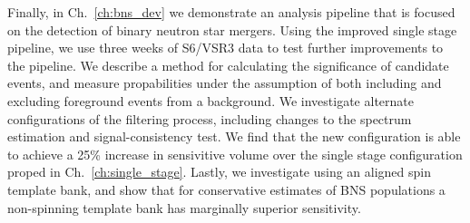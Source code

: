 Finally, in Ch.~\ref{ch:bns_dev} we demonstrate an analysis pipeline
that is focused on the detection of binary neutron star mergers. Using the 
improved single stage pipeline, we use three weeks of S6/VSR3 data to test 
further improvements to the pipeline. We describe a method for calculating
the significance of candidate events, and measure propabilities under the
assumption of both including and excluding foreground events from a background.
We investigate alternate configurations of the filtering process, including changes
to the spectrum estimation and signal-consistency test. We find that
the new configuration is able to achieve a 25\% increase in sensivitive volume over the
single stage configuration proped in Ch.~\ref{ch:single_stage}. Lastly,
we investigate using an aligned spin template bank, and show that for conservative 
estimates of BNS populations a non-spinning template bank has marginally superior 
sensitivity.

